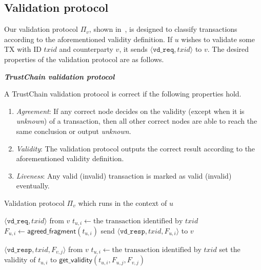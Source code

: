\subsection{Validation protocol}
Our validation protocol $\Pi_v$,
shown in~,
is designed to classify transactions according to the aforementioned validity definition.
If $u$ wishes to validate some TX with ID $txid$ and counterparty $v$, it sends $\langle \texttt{vd\_req}, txid \rangle$ to $v$.
The desired properties of the validation protocol are as follows.
\begin{definition}
\label{def:validation}
\textbf{\emph{TrustChain validation protocol}}

A TrustChain validation protocol is correct if the following properties hold.
\begin{enumerate}
    \item \emph{Agreement}:
        If any correct node decides on the validity (except when it is \emph{unknown}) of a transaction,
        then all other correct nodes are able to reach the same conclusion or output \emph{unknown}.
    \item \emph{Validity}:
        The validation protocol outputs the correct result
        according to the aforementioned validity definition.
    \item \emph{Liveness}:
        Any valid (invalid) transaction is marked as valid (invalid) eventually.
\end{enumerate}
\end{definition}

\begin{algorithm}
\caption{Validation protocol $\Pi_v$ which runs in the context of $u$}
\label{alg:vd-proto}

\begin{algorithmic}
    \Upon $\langle \texttt{vd\_req}, txid \rangle$ from $v$
        \State $t_{u, i} \gets \text{the transaction identified by } txid$
        \State $F_{u, i} \gets \textsf{agreed\_fragment}(t_{u, i})$
        \State send $\langle \texttt{vd\_resp}, txid, F_{u, i} \rangle$ to $v$

    \Upon $\langle \texttt{vd\_resp}, txid, F_{v, j} \rangle$ from $v$
        \State $t_{u, i} \gets \text{the transaction identified by } txid$
            \State set the validity of $t_{u, i}$ to $\textsf{get\_validity}(t_{u, i}, F_{u, j}, F_{v, j})$
        \EndIf
\end{algorithmic}
\end{algorithm}

